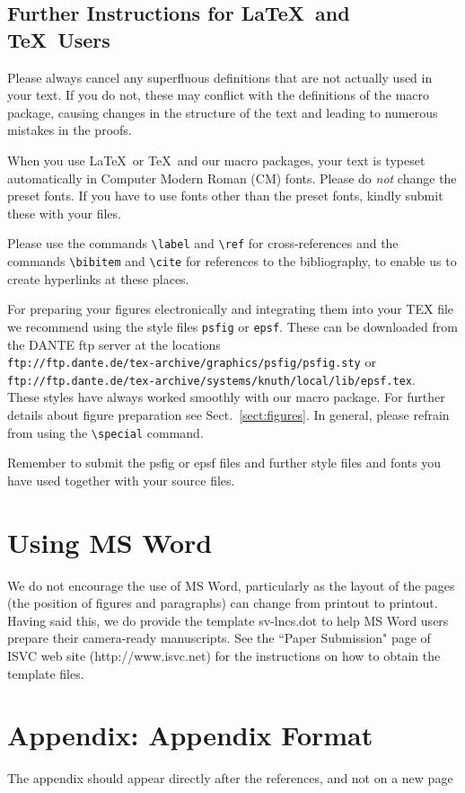 \documentclass[runningheads]{llncs}
\begin{document}
\subsection{Further Instructions for \LaTeX\ and \TeX\ Users}

Please always cancel any superfluous definitions that are
not actually used in your text. If you do not, these may conflict with
the definitions of the macro package, causing changes in the structure
of the text and leading to numerous mistakes in the proofs.

When you use \LaTeX\ or \TeX\ and our macro packages, your text is
typeset automatically in Computer Modern Roman (CM) fonts. Please do
{\it not} change the preset fonts. If you have to use fonts other
than the preset fonts, kindly submit these with your files.

Please use the commands \verb+\label+ and \verb+\ref+ for
cross-references and the commands \verb+\bibitem+ and \verb+\cite+ for
references to the bibliography, to enable us to create hyperlinks at
these places.

For preparing your figures electronically and integrating them into
your TEX file we recommend using the style files \verb+psfig+ or
\verb+epsf+. These can be downloaded from the DANTE ftp server at the
locations\\
\indent \verb+ftp://ftp.dante.de/tex-archive/graphics/psfig/psfig.sty+
or\\ \indent
\verb+ftp://ftp.dante.de/tex-archive/systems/knuth/local/lib/epsf.tex+.\\
These styles have always worked smoothly with our macro package. For
further details about figure preparation see Sect.~\ref{sect:figures}.
In general, please refrain from using the \verb+\special+ command.

Remember to submit the psfig or epsf files and further style files and
fonts you have used together with your source files.


\section{Using MS Word}
\label{sect:Word}

We do not encourage the use of MS Word, particularly as the layout of
the pages (the position of figures and paragraphs) can change from
printout to printout. Having said this, we do provide the template
sv-lncs.dot to help MS Word users
prepare their camera-ready manuscripts. See the ``Paper Submission" page
of ISVC web site (http://www.isvc.net) for the instructions on how
to obtain the template files.

\nocite{bal:cha:gra:pae}



\section*{Appendix: Appendix Format}
The appendix should appear directly after the references, and not on a new page
\end{document}
